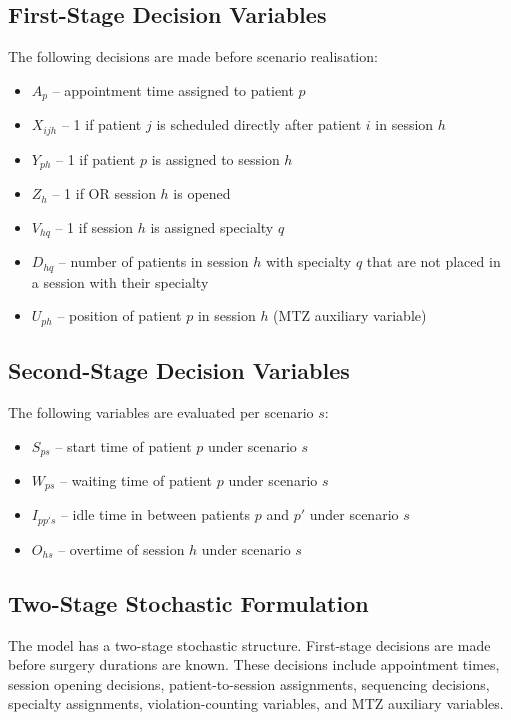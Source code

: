 \subsection{First-Stage Decision Variables}

The following decisions are made before scenario realisation:

\begin{itemize}
  \item $A_p$ -- appointment time assigned to patient $p$
  \item $X_{ijh}$ -- 1 if patient $j$ is scheduled directly after
        patient $i$ in session $h$
  \item $Y_{ph}$ -- 1 if patient $p$ is assigned to session $h$
  \item $Z_h$ -- 1 if OR session $h$ is opened
  \item $V_{hq}$ -- 1 if session $h$ is assigned specialty $q$
  \item $D_{hq}$ -- number of patients in session $h$ with specialty $q$
        that are not placed in a session with their specialty
  \item $U_{ph}$ -- position of patient $p$ in session
        $h$ (MTZ auxiliary variable)
\end{itemize}

\subsection{Second-Stage Decision Variables}

The following variables are evaluated per scenario $s$:

\begin{itemize}
  \item $S_{ps}$ -- start time of patient $p$ under
        scenario $s$
  \item $W_{ps}$ -- waiting time of patient $p$ under scenario $s$
  \item $I_{pp's}$ -- idle time in between patients $p$ and $p'$ under scenario $s$
  \item $O_{hs}$ -- overtime of session $h$ under scenario $s$
\end{itemize}

\subsection{Two-Stage Stochastic Formulation}

The model has a two-stage stochastic structure. First-stage decisions are made
before surgery durations are known. These decisions include appointment times,
session opening decisions, patient-to-session assignments, sequencing decisions,
specialty assignments, violation-counting variables, and MTZ auxiliary variables.

